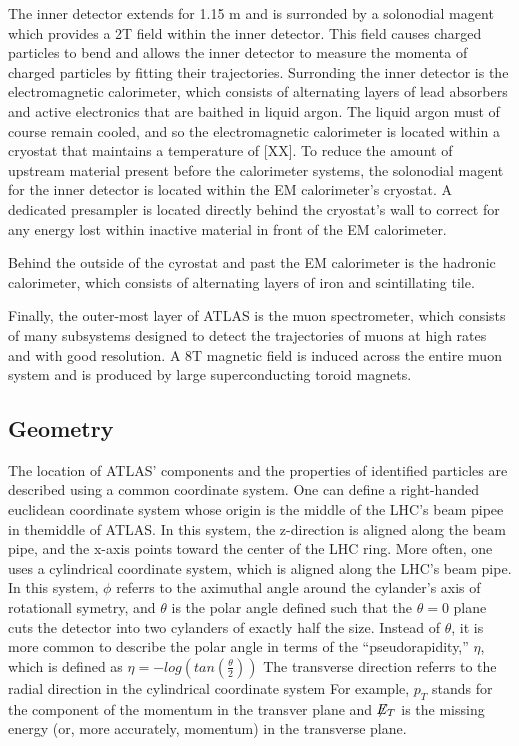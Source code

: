 The inner detector extends for 1.15 m and is surronded by a solonodial magent which provides a 2T field within the inner detector.
This field causes charged particles to bend and allows the inner detector to measure the momenta of charged particles by fitting their trajectories.
Surronding the inner detector is the electromagnetic calorimeter, which consists of alternating layers of lead absorbers and active electronics that are baithed in liquid argon.
The liquid argon must of course remain cooled, and so the electromagnetic calorimeter is located within a cryostat that maintains a temperature of [XX].
To reduce the amount of upstream material present before the calorimeter systems, the solonodial magent for the inner detector is located within the EM calorimeter's cryostat.
A dedicated presampler is located directly behind the cryostat's wall to correct for any energy lost within inactive material in front of the EM calorimeter.

Behind the outside of the cyrostat and past the EM calorimeter is the hadronic calorimeter, which consists of alternating layers of iron and scintillating tile.

Finally, the outer-most layer of ATLAS is the muon spectrometer, which consists of many subsystems designed to detect the trajectories of muons at high rates and with good resolution. 
A 8T magnetic field is induced across the entire muon system and is produced by large superconducting toroid magnets.


\subsection{Geometry}
The location of ATLAS' components and the properties of identified particles are described using a common coordinate system.
One can define a right-handed euclidean coordinate system whose origin is the middle of the LHC's beam pipee in themiddle of ATLAS.
In this system, the z-direction is aligned along the beam pipe, and the x-axis points toward the center of the LHC ring.
More often, one uses a cylindrical coordinate system, which is aligned along the LHC's beam pipe.
In this system, $\phi$ referrs to the aximuthal angle around the cylander's axis of rotationall symetry, and $\theta$ is the polar angle defined such that the $\theta=0$ plane cuts the detector into two cylanders of exactly half the size.
Instead of $\theta$, it is more common to describe the polar angle in terms of the ``pseudorapidity,'' $\eta$, which is defined as $\eta = -log(tan(\frac{\theta}{2}))$
The transverse direction referrs to the radial direction in the cylindrical coordinate system 
For example, $p_{T}$ stands for the component of the momentum in the transver plane and $\not\!\!{E_{T}}$ is the missing energy (or, more accurately, momentum) in the transverse plane.


